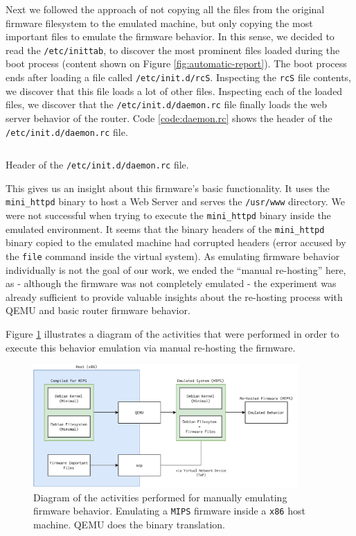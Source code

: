 Next we followed the approach of not copying all the files from the original firmware filesystem to the emulated machine, but only copying the most important files to emulate the firmware behavior. In this sense, we decided to read the {\tt /etc/inittab}, to discover the most prominent files loaded during the boot process (content shown on Figure \ref{fig:automatic-report}). The boot process ends after loading a file called {\tt /etc/init.d/rcS}. Inspecting the {\tt rcS} file contents, we discover that this file loads a lot of other files. Inspecting each of the loaded files, we discover that the {\tt /etc/init.d/daemon.rc} file finally loads the web server behavior of the router. Code \ref{code:daemon.rc} shows the header of the {\tt /etc/init.d/daemon.rc} file.

\begin{listing}[!ht]
\inputminted[fontsize=\footnotesize]{bash}{Code/daemon.rc}
\caption{Header of the {\tt /etc/init.d/daemon.rc} file.}
\label{code:daemon.rc}
\end{listing}

This gives us an insight about this firmware's basic functionality. It uses the {\tt mini\_httpd} binary to host a Web Server and serves the {\tt /usr/www} directory. We were not successful when trying to execute the {\tt mini\_httpd} binary inside the emulated environment. It seems that the binary headers of the {\tt mini\_httpd} binary copied to the emulated machine had corrupted headers (error accused by the {\tt file} command inside the virtual system). As emulating firmware behavior individually is not the goal of our work, we ended the ``manual re-hosting'' here, as - although the firmware was not completely emulated - the experiment was already sufficient to provide valuable insights about the re-hosting process with QEMU and basic router firmware behavior.

Figure \ref{fig:illustrated-manual-rehosting} illustrates a diagram of the activities that were performed in order to execute this behavior emulation via manual re-hosting the firmware.

\begin{figure}[H]
    \centering
    \includegraphics[width=0.9\textwidth]{figs/ManualReHosting.pdf}
    \caption{Diagram of the activities performed for manually emulating firmware behavior. Emulating a {\tt MIPS} firmware inside a {\tt x86} host machine. QEMU does the binary translation.}
    \label{fig:illustrated-manual-rehosting}
\end{figure}


